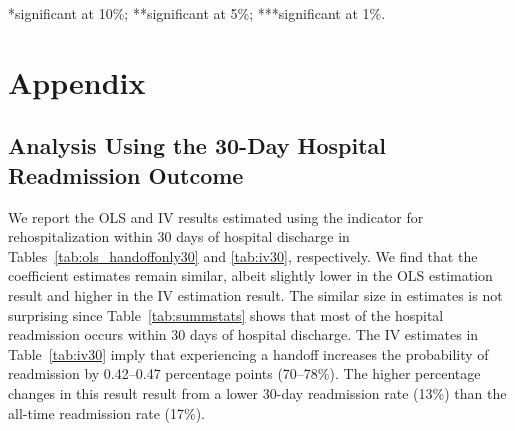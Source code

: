 \documentclass[final,12pt, notitlepage]{article}
\begin{document}
\begin{singlespace}
\begin{table}[H]
\begin{threeparttable}
\begin{tablenotes}
	*significant at 10\%; **significant at 5\%; ***significant at 1\%.
	\end{tablenotes}
\end{threeparttable}
\end{table}




\newpage
\section{Appendix}

\subsection{Analysis Using the 30-Day Hospital Readmission Outcome}
\label{appendix:hosp30}

We report the OLS and IV results estimated using the indicator for rehospitalization within 30 days of hospital discharge in Tables~\ref{tab:ols_handoffonly30} and \ref{tab:iv30}, respectively.
We find that the coefficient estimates remain similar, albeit slightly lower in the OLS estimation result and higher in the IV estimation result.
The similar size in estimates is not surprising since Table~\ref{tab:summstats} shows that most of the hospital readmission occurs within 30 days of hospital discharge.
The IV estimates in Table~\ref{tab:iv30} imply that experiencing a handoff increases the probability of readmission by 0.42--0.47 percentage points (70--78\%).
The higher percentage changes in this result result from a lower 30-day readmission rate (13\%) than the all-time readmission rate (17\%).


\end{singlespace}
\end{document}
